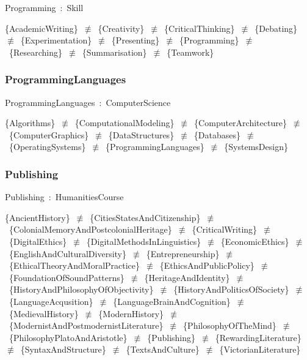 \documentclass{article}
\begin{document}
Programming~:~Skill

\{AcademicWriting\}~\ensuremath{\not\equiv}~\{Creativity\}~\ensuremath{\not\equiv}~\{CriticalThinking\}~\ensuremath{\not\equiv}~\{Debating\}~\ensuremath{\not\equiv}~\{Experimentation\}~\ensuremath{\not\equiv}~\{Presenting\}~\ensuremath{\not\equiv}~\{Programming\}~\ensuremath{\not\equiv}~\{Researching\}~\ensuremath{\not\equiv}~\{Summarisation\}~\ensuremath{\not\equiv}~\{Teamwork\}

\subsubsection*{ProgrammingLanguages}

ProgrammingLanguages~:~ComputerScience

\{Algorithms\}~\ensuremath{\not\equiv}~\{ComputationalModeling\}~\ensuremath{\not\equiv}~\{ComputerArchitecture\}~\ensuremath{\not\equiv}~\{ComputerGraphics\}~\ensuremath{\not\equiv}~\{DataStructures\}~\ensuremath{\not\equiv}~\{Databases\}~\ensuremath{\not\equiv}~\{OperatingSystems\}~\ensuremath{\not\equiv}~\{ProgrammingLanguages\}~\ensuremath{\not\equiv}~\{SystemsDesign\}

\subsubsection*{Publishing}

Publishing~:~HumanitiesCourse

\{AncientHistory\}~\ensuremath{\not\equiv}~\{CitiesStatesAndCitizenship\}~\ensuremath{\not\equiv}~\{ColonialMemoryAndPostcolonialHeritage\}~\ensuremath{\not\equiv}~\{CriticalWriting\}~\ensuremath{\not\equiv}~\{DigitalEthics\}~\ensuremath{\not\equiv}~\{DigitalMethodsInLinguistics\}~\ensuremath{\not\equiv}~\{EconomicEthics\}~\ensuremath{\not\equiv}~\{EnglishAndCulturalDiversity\}~\ensuremath{\not\equiv}~\{Entrepreneurship\}~\ensuremath{\not\equiv}~\{EthicalTheoryAndMoralPractice\}~\ensuremath{\not\equiv}~\{EthicsAndPublicPolicy\}~\ensuremath{\not\equiv}~\{FoundationOfSoundPatterns\}~\ensuremath{\not\equiv}~\{HeritageAndIdentity\}~\ensuremath{\not\equiv}~\{HistoryAndPhilosophyOfObjectivity\}~\ensuremath{\not\equiv}~\{HistoryAndPoliticsOfSociety\}~\ensuremath{\not\equiv}~\{LanguageAcqusition\}~\ensuremath{\not\equiv}~\{LanguageBrainAndCognition\}~\ensuremath{\not\equiv}~\{MedievalHistory\}~\ensuremath{\not\equiv}~\{ModernHistory\}~\ensuremath{\not\equiv}~\{ModernistAndPostmodernistLiterature\}~\ensuremath{\not\equiv}~\{PhilosophyOfTheMind\}~\ensuremath{\not\equiv}~\{PhilosophyPlatoAndAristotle\}~\ensuremath{\not\equiv}~\{Publishing\}~\ensuremath{\not\equiv}~\{RewardingLiterature\}~\ensuremath{\not\equiv}~\{SyntaxAndStructure\}~\ensuremath{\not\equiv}~\{TextsAndCulture\}~\ensuremath{\not\equiv}~\{VictorianLiterature\}
\end{document}
